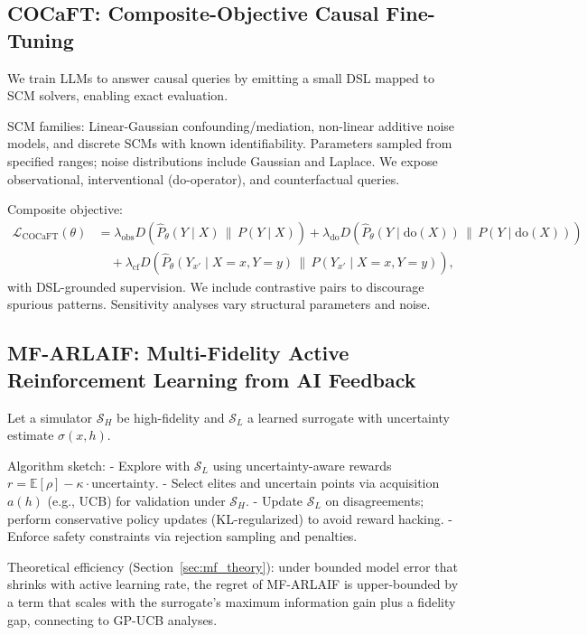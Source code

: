 \documentclass{article}
\begin{document}
\subsection{COCaFT: Composite-Objective Causal Fine-Tuning}
We train LLMs to answer causal queries by emitting a small DSL mapped to SCM solvers, enabling exact evaluation.

SCM families:
Linear-Gaussian confounding/mediation, non-linear additive noise models, and discrete SCMs with known identifiability. Parameters sampled from specified ranges; noise distributions include Gaussian and Laplace. We expose observational, interventional (do-operator), and counterfactual queries.

Composite objective:
\begin{align}
\mathcal{L}_{\mathrm{COCaFT}}(\theta) &= \lambda_{\mathrm{obs}} D\!\left(\hat{P}_\theta(Y\mid X)\,\big\|\,P(Y\mid X)\right)
+ \lambda_{\mathrm{do}} D\!\left(\hat{P}_\theta(Y\mid \mathrm{do}(X))\,\big\|\,P(Y\mid \mathrm{do}(X))\right) \\
&\quad + \lambda_{\mathrm{cf}} D\!\left(\hat{P}_\theta(Y_{x'} \mid X=x,Y=y)\,\big\|\,P(Y_{x'} \mid X=x,Y=y)\right),
\end{align}
with DSL-grounded supervision. We include contrastive pairs to discourage spurious patterns. Sensitivity analyses vary structural parameters and noise.

\subsection{MF-ARLAIF: Multi-Fidelity Active Reinforcement Learning from AI Feedback}
Let a simulator $\mathcal{S}_H$ be high-fidelity and $\mathcal{S}_L$ a learned surrogate with uncertainty estimate $\sigma(x,h)$.

Algorithm sketch:
- Explore with $\mathcal{S}_L$ using uncertainty-aware rewards $r=\mathbb{E}[\rho]\!-\!\kappa\cdot \mathrm{uncertainty}$.
- Select elites and uncertain points via acquisition $a(h)$ (e.g., UCB) for validation under $\mathcal{S}_H$.
- Update $\mathcal{S}_L$ on disagreements; perform conservative policy updates (KL-regularized) to avoid reward hacking.
- Enforce safety constraints via rejection sampling and penalties.

Theoretical efficiency (Section~\ref{sec:mf_theory}): under bounded model error that shrinks with active learning rate, the regret of MF-ARLAIF is upper-bounded by a term that scales with the surrogate's maximum information gain plus a fidelity gap, connecting to GP-UCB analyses.
\end{document}
